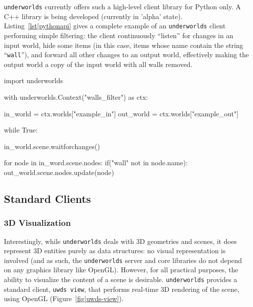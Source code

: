 \documentclass[letterpaper, 10 pt, conference]{ieeeconf}  %
\newcommand{\uwds}{{\tt underworlds}\xspace}
\begin{document}
\uwds currently offers such a high-level client library for Python only. A C++
library is being developed (currently in 'alpha' state).
Listing~\ref{lst|pythonapi} gives a complete example of an \uwds client
performing simple filtering: the client continuously ``listen'' for changes in
an input world, hide some items (in this case, items whose name contain the
string ``{\tt wall}''), and forward all other changes to an output world,
effectively making the output world a copy of the input world with all walls
removed.

\begin{listing}[h!]

\begin{pythoncode}
import underworlds

with underworlds.Context("walls_filter") as ctx:

    in_world = ctx.worlds["example_in"]
    out_world = ctx.worlds["example_out"]

    while True:

        in_world.scene.waitforchanges()

        for node in in_word.scene.nodes:
            if("wall" not in node.name):
                out_world.scene.nodes.update(node)


\end{pythoncode}
    \caption{Example of a simple \uwds Python client named {\tt walls\_filter}:
    the client connects to the \uwds network, efficiently accesses the world
    {\tt example\_in}, filter out some objects, and publish the remaining
    objects in the world {\tt example\_out}.} \label{lst|pythonapi}
\end{listing}

\subsection{Standard Clients}
\label{std_clients}

\subsubsection{3D Visualization}

Interestingly, while \uwds deals with 3D geometries and scenes, it does
represent 3D entities purely as data structures: no visual representation is
involved (and as such, the \uwds server and core libraries do not depend on any
graphics library like OpenGL). However, for all practical purposes, the ability
to visualize the content of a scene is desirable. \uwds provides a standard
client, {\tt uwds view}, that performs real-time 3D rendering of the scene,
using OpenGL (Figure~\ref{fig|uwds-view}).
\end{document}

